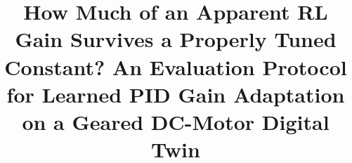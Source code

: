 \documentclass[conference]{IEEEtran}
\begin{document}
\title{How Much of an Apparent RL Gain Survives a Properly Tuned Constant? An Evaluation Protocol for Learned PID Gain Adaptation on a Geared DC-Motor Digital Twin}
\author{}
\maketitle
















\appendices


\end{document}
